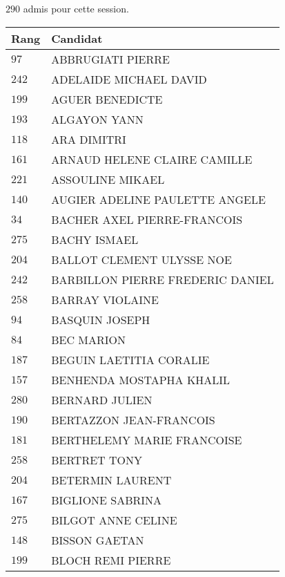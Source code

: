 




  $290$ admis pour cette session.

  \begin{xltabular}{\linewidth}{|l|X|}
    \hline
    \textbf{Rang} & \textbf{Candidat} \\
    \hline
    $97$ & ABBRUGIATI PIERRE \\
    \hline
    $242$ & ADELAIDE MICHAEL DAVID \\
    \hline
    $199$ & AGUER BENEDICTE \\
    \hline
    $193$ & ALGAYON YANN \\
    \hline
    $118$ & ARA DIMITRI \\
    \hline
    $161$ & ARNAUD HELENE CLAIRE CAMILLE \\
    \hline
    $221$ & ASSOULINE MIKAEL \\
    \hline
    $140$ & AUGIER ADELINE PAULETTE ANGELE \\
    \hline
    $34$ & BACHER AXEL PIERRE-FRANCOIS \\
    \hline
    $275$ & BACHY ISMAEL \\
    \hline
    $204$ & BALLOT CLEMENT ULYSSE NOE \\
    \hline
    $242$ & BARBILLON PIERRE FREDERIC DANIEL \\
    \hline
    $258$ & BARRAY VIOLAINE \\
    \hline
    $94$ & BASQUIN JOSEPH \\
    \hline
    $84$ & BEC MARION \\
    \hline
    $187$ & BEGUIN LAETITIA CORALIE \\
    \hline
    $157$ & BENHENDA MOSTAPHA KHALIL \\
    \hline
    $280$ & BERNARD JULIEN \\
    \hline
    $190$ & BERTAZZON JEAN-FRANCOIS \\
    \hline
    $181$ & BERTHELEMY MARIE FRANCOISE \\
    \hline
    $258$ & BERTRET TONY \\
    \hline
    $204$ & BETERMIN LAURENT \\
    \hline
    $167$ & BIGLIONE SABRINA \\
    \hline
    $275$ & BILGOT ANNE CELINE \\
    \hline
    $148$ & BISSON GAETAN \\
    \hline
    $199$ & BLOCH REMI PIERRE \\

\end{xltabular}
